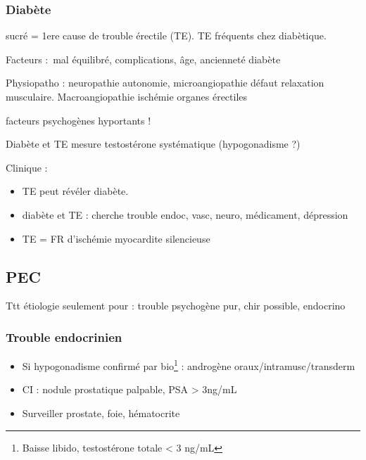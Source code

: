 \documentclass[11pt]{article}
\begin{document}
\subsubsection{Diabète}
\label{sec:org14f14a0}
sucré = 1ere cause de trouble érectile (TE). TE fréquents chez diabètique. 

Facteurs : mal équilibré, complications, âge, ancienneté diabète

Physiopatho : neuropathie autonomie, microangiopathie \thus défaut relaxation
musculaire. Macroangiopathie \thus ischémie organes érectiles

\danger facteurs psychogènes hyportants !

Diabète et TE \thus mesure testostérone systématique (hypogonadisme ?)

Clinique : 
\begin{itemize}
\item TE peut révéler diabète.
\item diabète et TE : cherche trouble endoc, vasc, neuro, médicament, dépression
\item TE = FR d'ischémie myocardite silencieuse \danger
\end{itemize}

\subsection{PEC}
\label{sec:org2f19c1a}
Ttt étiologie seulement pour : trouble psychogène pur, chir possible, endocrino

\subsubsection{Trouble endocrinien}
\label{sec:org6b14046}
\begin{itemize}
\item Si hypogonadisme confirmé par bio\footnote{Baisse libido, testostérone totale < 3 ng/mL} : androgène oraux/intramusc/transderm
\item CI : nodule prostatique palpable, PSA > 3ng/mL
\item Surveiller prostate, foie, hématocrite
\end{itemize}
\end{document}
